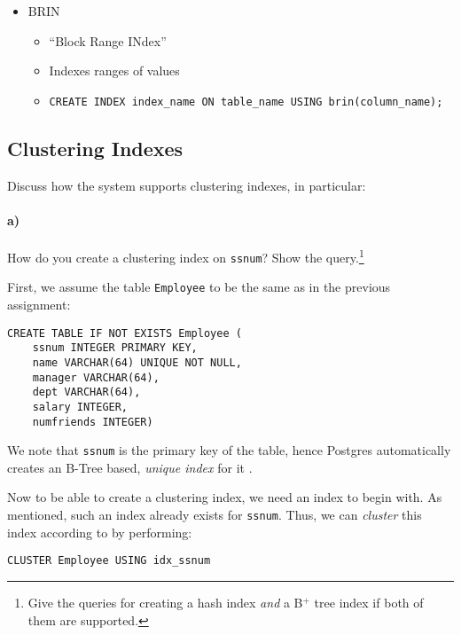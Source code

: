 \documentclass[11pt]{scrartcl}
\begin{document}
\begin{itemize}
\begin{itemize}
\begin{lstlisting}[style=dbtsql]
    \end{lstlisting}
  \end{itemize}
  \item BRIN \cite{PostgreSQL2024IndexTypes}
  \begin{itemize}
    \item \enquote{Block Range INdex}
    \item Indexes ranges of values
    \item \begin{lstlisting}[style=dbtsql]
CREATE INDEX index_name ON table_name USING brin(column_name);
    \end{lstlisting}
  \end{itemize}
\end{itemize}

\subsection{Clustering Indexes}

Discuss how the system supports clustering indexes, in particular:

\paragraph{a)}

How do you create a clustering index on \texttt{ssnum}? Show the query.\footnote{Give the queries for creating a hash index \emph{and} a B$^+$ tree index if both of them are supported.}

First, we assume the table \texttt{Employee} to be the same as in the previous assignment:
\begin{lstlisting}[style=dbtsql]
CREATE TABLE IF NOT EXISTS Employee (
    ssnum INTEGER PRIMARY KEY,
    name VARCHAR(64) UNIQUE NOT NULL,
    manager VARCHAR(64),
    dept VARCHAR(64),
    salary INTEGER,
    numfriends INTEGER)
\end{lstlisting}

We note that \texttt{ssnum} is the primary key of the table, hence Postgres automatically creates an B-Tree based,
\textit{unique index} for it \cite{PostgreSQL2024Unique}.

Now to be able to create a clustering index, we need an index to begin with.
As mentioned, such an index already exists for \texttt{ssnum}.
Thus, we can \textit{cluster} this index according to \cite{PostgreSQL2024Cluster} by performing:

\begin{lstlisting}[style=dbtsql]
CLUSTER Employee USING idx_ssnum
\end{lstlisting}
\end{document}
